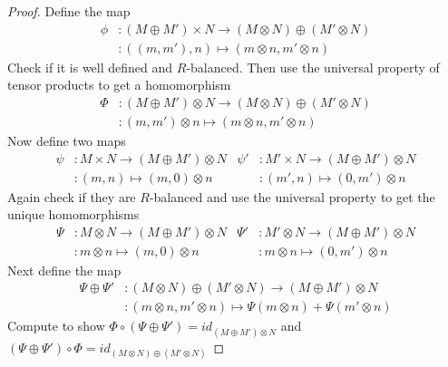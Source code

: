 \documentclass{article}
\theoremstyle{plain}
\theoremstyle{definition}
\theoremstyle{remark}
\begin{document}
  \begin{proof}
    Define the map 
    \begin{align*}
      \phi&:(M\oplus M')\times N\to(M\otimes N)\oplus(M'\otimes N)\\
            &:((m,m'),n)\mapsto (m\otimes n,m'\otimes n)
    \end{align*}
    Check if it is well defined and $R$-balanced.
    Then use the universal property of tensor products to get a homomorphism
    \begin{align*}
      \Phi&:(M\oplus M')\otimes N\to(M\otimes N)\oplus(M'\otimes N)\\
            &:(m,m')\otimes n\mapsto (m\otimes n,m'\otimes n)
    \end{align*}
    Now define two maps
    \begin{align*}
      \psi&:M\times N\to(M\oplus M')\otimes N
      &\psi'&:M'\times N\to(M\oplus M')\otimes N\\
          &:(m,n)\mapsto (m,0)\otimes n
          &&:(m',n)\mapsto (0,m')\otimes n
    \end{align*}
    Again check if they are $R$-balanced and use the universal property 
    to get the unique homomorphisms
    \begin{align*}
      \Psi&:M\otimes N\to(M\oplus M')\otimes N
      &\Psi'&:M'\otimes N\to(M\oplus M')\otimes N\\
          &:m\otimes n\mapsto (m,0)\otimes n
          &&:m\otimes n\mapsto (0,m')\otimes n
    \end{align*}
    Next define the map 
    \begin{align*}
      \Psi\oplus\Psi'&:(M\otimes N)\oplus(M'\otimes N)\to(M\oplus M')\otimes N \\
      &:(m\otimes n,m'\otimes n)\mapsto \Psi(m\otimes n)+\Psi(m'\otimes n)
    \end{align*}
    Compute to show $\Phi\circ(\Psi\oplus\Psi')=id_{(M\oplus M')\otimes N}$
    and $(\Psi\oplus\Psi')\circ\Phi=id_{(M\otimes N)\oplus(M'\otimes N)}$
  \end{proof}
\end{document}
